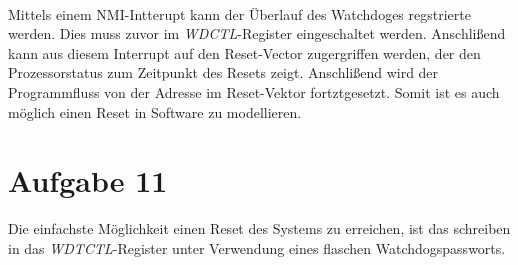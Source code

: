 \paragraph*{}
Mittels einem NMI-Intterupt kann der Überlauf des Watchdoges regstrierte werden. Dies muss zuvor im {\em WDCTL}-Register eingeschaltet werden. Anschlißend kann aus diesem Interrupt auf den Reset-Vector zugergriffen werden, der den Prozessorstatus zum Zeitpunkt des Resets zeigt. Anschlißend wird der Programmfluss von der Adresse im Reset-Vektor fortztgesetzt. Somit ist es auch möglich einen Reset in Software zu modellieren.

\section*{Aufgabe 11}

Die einfachste Möglichkeit einen Reset des Systems zu erreichen, ist das schreiben in das {\em WDTCTL}-Register unter Verwendung eines flaschen Watchdogspassworts.\\



